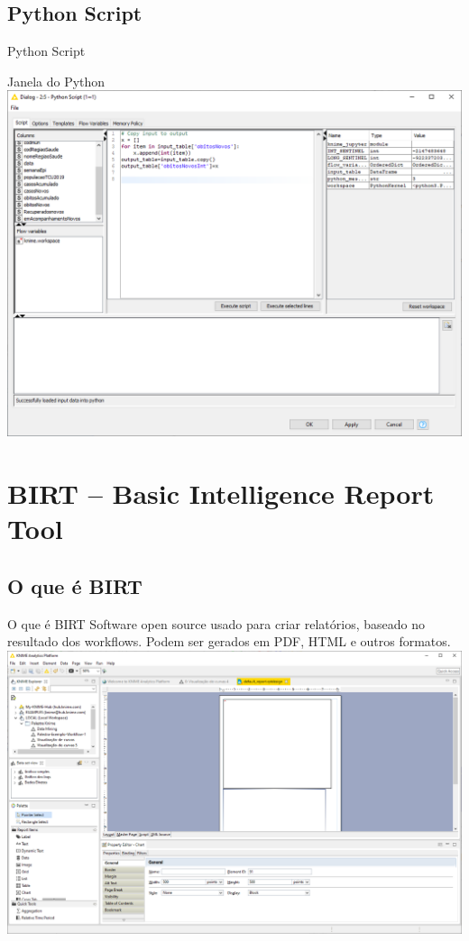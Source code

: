 \documentclass{beamer}
\begin{document}
\subsection{Python Script}
\begin{frame}{Python Script}
    \centering
    
\end{frame}

\begin{frame}{Janela do Python}
    \centering
    \includegraphics[width=.8\linewidth]{Images/python2.png}
\end{frame}


\section{BIRT -- Basic Intelligence Report Tool}

\subsection{O que é BIRT}
\begin{frame}{O que é BIRT}
Software open source usado para criar relatórios, baseado no resultado dos workflows.
Podem ser gerados em PDF, HTML e outros formatos.
\vfill
\centering
\includegraphics[height=0.4\textheight]{Images/birtscreen.png}
\end{frame} 
\end{document}
